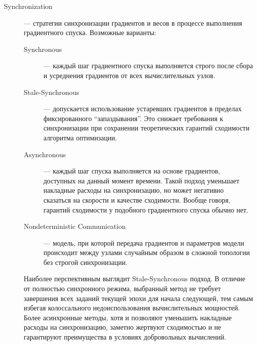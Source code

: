 \documentclass[a4paper,12pt]{extarticle}
\begin{document}
\begin{description}
    \item[Synchronization] — стратегии синхронизации градиентов и весов в процессе выполнения градиентного спуска. Возможные варианты:
    \begin{description}
        \item[Synchronous] — каждый шаг градиентного спуска выполняется строго после сбора и усреднения градиентов от всех вычислительных узлов.
        \item[Stale-Synchronous] — допускается использование устаревших градиентов в пределах фиксированного ``запаздывания''. Это снижает требования к синхронизации при сохранении теоретических гарантий сходимости алгоритма оптимизации.
        \item[Asynchronous] — каждый шаг спуска выполняется на основе градиентов, доступных на данный момент времени. Такой подход уменьшает накладные расходы на синхронизацию, но может негативно сказаться на скорости и качестве сходимости. Вообще говоря, гарантий сходимости у подобного градиентного спуска обычно нет.
        \item[Nondeterministic Communication] — модель, при которой передача градиентов и параметров модели происходит между узлами случайным образом в сложной топологии без строгой синхронизации.
    \end{description}

    Наиболее перспективным выглядит Stale-Synchronous подход. В отличие от полностью синхронного режима, выбранный метод не требует завершения всех заданий текущей эпохи для начала следующей, тем самым избегая колоссального недоиспользования вычислительных мощностей. Более асинхронные методы, хотя и позволяют уменьшить накладные расходы на синхронизацию, заметно жертвуют сходимостью и не гарантируют преимущества в условиях добровольных вычислений.


\end{description}
\end{document}
